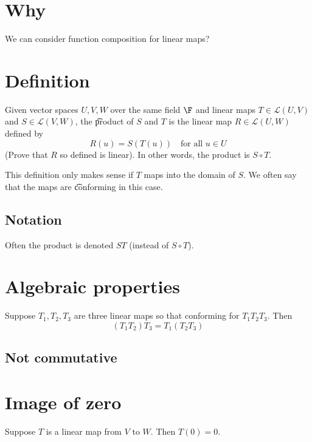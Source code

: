 
\section*{Why}

We can consider function composition for linear maps?

\section*{Definition}

Given vector spaces $U, V, W$ over the same field $\F $ and linear maps $T \in \mathcal{L} (U, V)$ and $S \in \mathcal{L} (V, W)$, the \t{product} of $S$ and $T$ is the linear map $R \in \mathcal{L} (U, W)$ defined by
\[
R(u) = S(T(u)) \quad \text{for all } u \in U
\]
(Prove that $R$ so defined is linear).
In other words, the product is $S \circ T$.

This definition only makes sense if $T$ maps into the domain of $S$.
We often say that the maps are \t{conforming} in this case.

\subsection*{Notation}

Often the product is denoted $ST$ (instead of $S \circ T$).

\section*{Algebraic properties}

\begin{proposition}[associativity]
Suppose $T_1, T_2, T_3$ are three linear maps so that conforming for $T_1T_2T_3$.
Then
\[
(T_1T_2)T_3 = T_1(T_2T_3)
\]
\end{proposition}

\subsection*{Not commutative}

\section*{Image of zero}

\begin{proposition}
Suppose $T$ is a linear map from $V$ to $W$.
Then $T(0) = 0$.
\end{proposition}

\blankpage